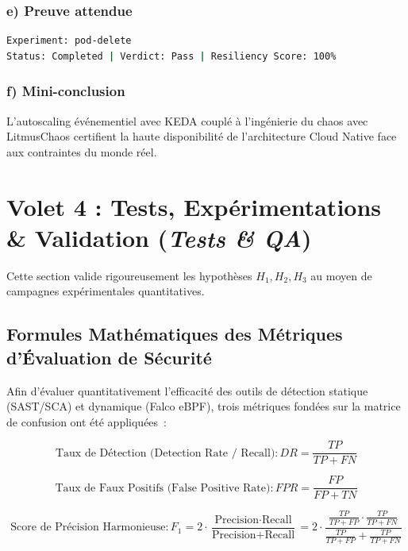\subsubsection{e) Preuve attendue}
\begin{lstlisting}[language=bash, caption={Rapport d'expérience Chaos Engineering Litmus}, label={lst:litmus_proof}]
Experiment: pod-delete
Status: Completed | Verdict: Pass | Resiliency Score: 100%
\end{lstlisting}

\subsubsection{f) Mini-conclusion}
L'autoscaling événementiel avec KEDA couplé à l'ingénierie du chaos avec LitmusChaos certifient la haute disponibilité de l'architecture Cloud Native face aux contraintes du monde réel.



\section{Volet 4 : Tests, Expérimentations \& Validation (\textit{Tests \& QA})}
\label{sec:volet_tests}

Cette section valide rigoureusement les hypothèses $H_1, H_2, H_3$ au moyen de campagnes expérimentales quantitatives.

\subsection{Formules Mathématiques des Métriques d'Évaluation de Sécurité}

Afin d'évaluer quantitativement l'efficacité des outils de détection statique (SAST/SCA) et dynamique (Falco eBPF), trois métriques fondées sur la matrice de confusion ont été appliquées~:

\begin{equation}
\text{Taux de Détection (Detection Rate / Recall)} : DR = \frac{TP}{TP + FN}
\label{eq:dr_formula}
\end{equation}

\begin{equation}
\text{Taux de Faux Positifs (False Positive Rate)} : FPR = \frac{FP}{FP + TN}
\label{eq:fpr_formula}
\end{equation}

\begin{equation}
\text{Score de Précision Harmonieuse} : F_1 = 2 \cdot \frac{\text{Precision} \cdot \text{Recall}}{\text{Precision} + \text{Recall}} = 2 \cdot \frac{\frac{TP}{TP+FP} \cdot \frac{TP}{TP+FN}}{\frac{TP}{TP+FP} + \frac{TP}{TP+FN}}
\label{eq:f1_formula}
\end{equation}

